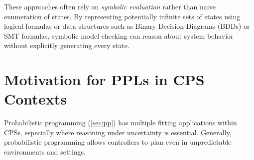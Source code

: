 These approaches often rely on \textit{symbolic evaluation} rather than naive enumeration of states. By representing potentially infinite sets of states using logical
formulas or data structures such as Binary Decision Diagrams (BDDs) or SMT formulas, symbolic model checking can reason about system behavior without explicitly
generating every state.

\section{Motivation for PPLs in CPS Contexts}

Probabilistic programming (\ref{sec:pp}) has multiple fitting applications within CPSs, especially where reasoning under uncertainty is essential. Generally, probabilistic programming
allows controllers to plan even in unpredictable environments and settings.

